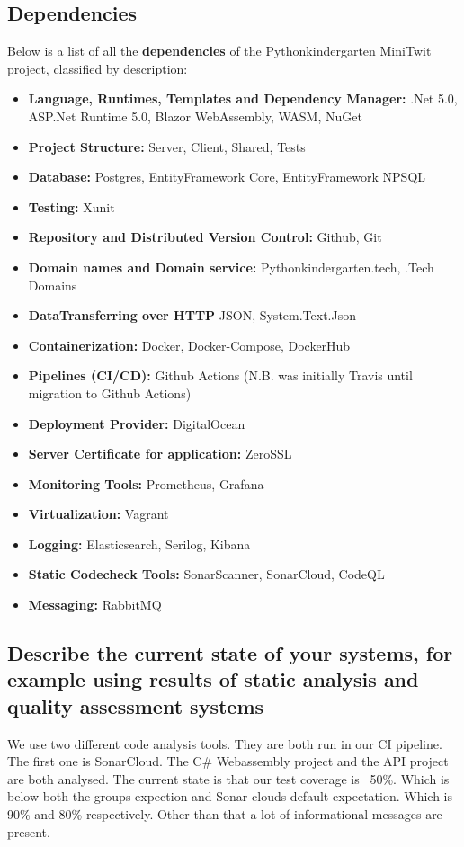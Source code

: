 \subsection{Dependencies}
Below is a list of all the \textbf{dependencies} of the Pythonkindergarten MiniTwit project, classified by description:
\begin{itemize}
    \item \textbf{Language, Runtimes, Templates and Dependency Manager:}
      .Net 5.0, ASP.Net Runtime 5.0, Blazor WebAssembly, WASM, NuGet
    \item \textbf{Project Structure:} Server, Client, Shared, Tests
    \item \textbf{Database:} Postgres, EntityFramework Core, EntityFramework NPSQL
    \item \textbf{Testing:} Xunit
    \item \textbf{Repository and Distributed Version Control:} Github, Git
    \item \textbf{Domain names and Domain service:} Pythonkindergarten.tech, .Tech Domains
    \item \textbf{DataTransferring over HTTP} JSON, System.Text.Json
    \item \textbf{Containerization:} Docker, Docker-Compose, DockerHub
    \item \textbf{Pipelines (CI/CD):} Github Actions (N.B. was initially Travis until migration to Github Actions)
    \item \textbf{Deployment Provider:} DigitalOcean
    \item \textbf{Server Certificate for application:} ZeroSSL
    \item \textbf{Monitoring Tools:} Prometheus, Grafana
    \item \textbf{Virtualization:} Vagrant
    \item \textbf{Logging:} Elasticsearch, Serilog, Kibana
    \item \textbf{Static Codecheck Tools:} SonarScanner, SonarCloud, CodeQL
    \item \textbf{Messaging:} RabbitMQ
\end{itemize}




\subsection{Describe the current state of your systems, for example using results of static analysis and quality assessment systems}
We use two different code analysis tools. 
They are both run in our CI pipeline. 
The first one is SonarCloud. The C\# Webassembly project and the API project are both analysed. 
The current state is that our test coverage is ~50\%. Which is below both the groups expection and Sonar clouds default expectation. 
Which is 90\% and 80\% respectively. 
Other than that a lot of informational messages are present. 

